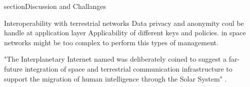 section{Discussion and Challanges}
\label{sec:discussion}

Interoperability with terrestrial networks
Data privacy and anonymity coul be handle at application layer
Applicability of different keys and policies. in space networks might be too complex to perform this types of management. 

"The Interplanetary Internet named was deliberately coined to suggest a far-future integration of space and terrestrial communication infrastructure to support the migration of human intelligence through the Solar System" \cite{burleigh2003interplanetary}. 

